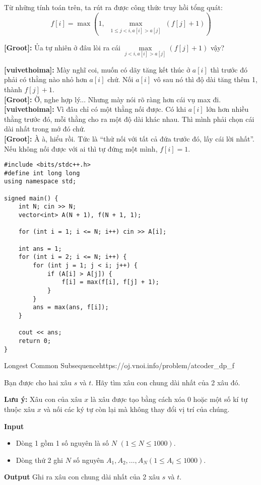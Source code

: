 Từ những tính toán trên, ta rút ra được công thức truy hồi tổng quát:
\[
    f[i] = \max \left( 1,\ \max_{\substack{1 \leq j < i, a[i] > a[j]}} \left( f[j] + 1 \right) \right)
\]


\textbf{[Groot]:} Ủa tự nhiên ở đâu lòi ra cái $\max\limits_{j<i, a[i]>a[j]} (f[j]+1)$ vậy? 

\textbf{[vuivethoima]:} Mày nghĩ coi, muốn có dãy tăng kết thúc ở $a[i]$ thì trước đó phải có thằng nào nhỏ hơn $a[i]$ chứ. 
Nối $a[i]$ vô sau nó thì độ dài tăng thêm 1, thành $f[j]+1$.\\

\textbf{[Groot]:} Ờ, nghe hợp lý... Nhưng mày nói rõ ràng hơn cái vụ max đi.\\

\textbf{[vuivethoima]:} Vì đâu chỉ có một thằng nối được. 
Có khi $a[i]$ lớn hơn nhiều thằng trước đó, mỗi thằng cho ra một độ dài khác nhau. 
Thì mình phải chọn cái dài nhất trong mớ đó chứ.\\

\textbf{[Groot]:} À à, hiểu rồi. Tức là “thử nối với tất cả đứa trước đó, lấy cái lời nhất”. 
Nếu không nối được với ai thì tự đứng một mình, $f[i]=1$.\\

\begin{lstlisting}[title=\centering \textbf{Cài đặt}]
#include <bits/stdc++.h>
#define int long long
using namespace std;

signed main() {
    int N; cin >> N;
    vector<int> A(N + 1), f(N + 1, 1);

    for (int i = 1; i <= N; i++) cin >> A[i];

    int ans = 1;
    for (int i = 2; i <= N; i++) {
        for (int j = 1; j < i; j++) {
            if (A[i] > A[j]) {
                f[i] = max(f[i], f[j] + 1);
            }
        }
        ans = max(ans, f[i]);
    }

    cout << ans;
    return 0;
}
\end{lstlisting}


\begin{baitap}{Longest Common Subsequence}{https://oj.vnoi.info/problem/atcoder\_dp\_f}

Bạn được cho hai xâu $s$ và $t$. Hãy tìm xâu con chung dài nhất của 2 xâu đó.

\textbf{Lưu ý: }Xâu con của xâu $x$ là xâu được tạo bằng cách xóa $0$ hoặc một số kí tự thuộc xâu $x$ và nối các ký tự còn lại mà không thay đổi vị trí của chúng.

\textbf{Input}
\begin{itemize}[noitemsep]
  \item Dòng 1 gồm 1 số nguyên là số $N$ $(1 \leq N \leq 1000)$.
  \item Dòng thứ 2 ghi $N$ số nguyên $A_1, A_2, \dots, A_N (1 \leq A_i \leq 1000)$.
\end{itemize}

\textbf{Output}
Ghi ra xâu con chung dài nhất của 2 xâu $s$ và $t$.

\end{baitap}

